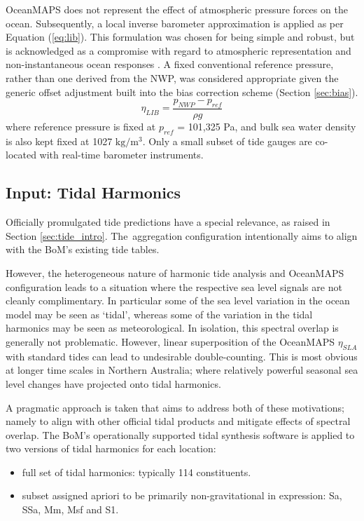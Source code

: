 OceanMAPS does not represent the effect of atmospheric pressure forces on the ocean.
Subsequently, a local inverse barometer approximation is applied as per Equation (\ref{eq:lib}).
This formulation was chosen for being simple and robust, but is acknowledged as a compromise with regard to atmospheric representation and non-instantaneous ocean responses \cite{Mathers:2004bk}.
A fixed conventional reference pressure, rather than one derived from the NWP, was considered appropriate given the generic offset adjustment built into the bias correction scheme (Section \ref{sec:bias}).  
\begin{equation}
  \eta_{LIB} = \frac{ p_{NWP} - p_{ref} }{ \rho g }
  \label{eq:lib}
\end{equation}
where reference pressure is fixed at $p_{ref}$ = 101,325 Pa, and bulk sea water density is also kept fixed at 1027 $\text{kg}/\text{m}^3$.
Only a small subset of tide gauges are co-located with real-time barometer instruments.


\subsection{Input: Tidal Harmonics }
\label{sec:harmonics}
Officially promulgated tide predictions have a special relevance, as raised in Section \ref{sec:tide_intro}.
The~aggregation configuration intentionally aims to align with the BoM's existing tide tables. 

However, the heterogeneous nature of harmonic tide analysis and OceanMAPS configuration leads to a situation where the respective sea level signals are not cleanly complimentary.
In particular some of the sea level variation in the ocean model may be seen as `tidal', whereas some of the variation in the tidal harmonics may be seen as meteorological.   
In isolation, this spectral overlap is generally not problematic. 
However, linear superposition of the OceanMAPS $\eta_{SLA}$ with standard tides can lead to undesirable double-counting. 
This is most obvious at longer time scales in Northern Australia; where relatively powerful seasonal sea level changes have projected onto tidal harmonics.


A pragmatic approach is taken that aims to address both of these motivations; namely to align with other official tidal products and mitigate effects of spectral overlap.
The BoM's operationally supported tidal synthesis software is applied to two versions of tidal harmonics for each location:
\begin{itemize}
  \item full set of tidal harmonics: typically 114 constituents.
  \item subset assigned apriori to be primarily non-gravitational in expression: Sa, SSa, Mm, Msf and S1.
\end{itemize}

